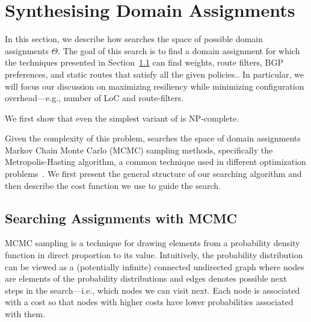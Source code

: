 \section{Synthesising Domain Assignments}
\label{sec:synth-dom-ass}

In this section, we describe how \name searches the space of possible
domain assignments $\Theta$.
The goal of this search is to find a domain assignment for which
the techniques presented in Section~\ref{} can find weights, route filters,
BGP preferences, and static routes that satisfy all the given  policies..
In particular, we will focus our discussion on maximizing resiliency while minimizing
configuration overhead---e.g.,  number of LoC and route-filters.

We first show that even the simplest variant of  is NP-complete.
\begin{theorem}
\end{theorem}
Given the complexity of this problem, \name  searches the space of domain
assignments Markov
Chain Monte Carlo (MCMC) sampling methods, specifically the Metropolis-Hasting
algorithm, a common technique used in different optimization 
problems~\cite{stoke}. 
We first present the general structure of our searching algorithm and 
then describe the cost function we use to guide the search.

\subsection{Searching Assignments with MCMC}
MCMC sampling is a technique for 
drawing elements from a
probability density function in direct proportion to its value.
Intuitively, the probability distribution can be viewed as a (potentially infinite) 
connected undirected graph
where nodes are elements of the probability distributions
and edges denotes possible next steps in the search---i.e.,
which nodes we can visit next.
Each node is associated with a cost so that nodes with higher costs have lower
probabilities associated with them.

